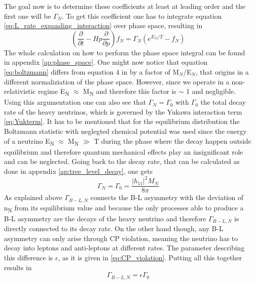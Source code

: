 The goal now is to determine these coefficients at least at leading order and the first one will be $\Gamma_N$. To get this coefficient one has to integrate equation \ref{eq:L_rate_expanding_interaction} over phase space, resulting in
\begin{equation}
	\left(\frac{\partial}{\partial t}-Hp\frac{\partial}{\partial p}\right)f_N=\Gamma_N\left(e^{E_N/T}-f_N\right)
	\label{eq:boltzmann}
\end{equation}
The whole calculation on how to perform the phase space integral can be found in appendix \ref{ap:phase_space}. \newline
One might now notice that equation \ref{eq:boltzmann} differs from equation 4 in \cite{Bodeker:2013qaa} by a factor of M$_N$/E$_N$, that origins in a different normaliziation of the phase space. However, since we operate in a non-relativistic regime E\textsubscript{N} $\approx$ M\textsubscript{N} and therefore this factor is $\sim$ 1 and negligible. Using this argumentation one can also see that $\Gamma_N=\Gamma_0$ with $\Gamma_0$ the total decay rate of the heavy neutrinos, which is governed by the Yukawa interaction term \ref{eq:Yukterm}. It has to be mentioned that for the equilibrium distribution the Boltzmann statistic with neglegted chemical potential was used since the energy of a neutrino E\textsubscript{N} $\approx$ M\textsubscript{N} $\gg$ T during the phase where the decay happen outside equilibrium and therefore quantum mechanical effects play an insignificant role and can be neglected. Going back to the decay rate, that can be calculated as done in appendix \ref{ap:tree_level_decay}, one gets
\begin{equation}
\Gamma_N=\Gamma_0=\frac{|h_{11}|^2M_N}{8\pi}
\label{eq:Gamma_N}
\end{equation}
As explained above $\Gamma_{B-L,N}$ connects the B-L asymmetry with the deviation of n\textsubscript{N} from its equilibrium value and because the only processes able to produce a B-L asymmetry  are the decays of the heavy neutrino and therefore $\Gamma_{B-L,N}$ is directly connected to its decay rate. On the other hand though, any B-L asymmetry can only arise through CP violation, meaning the neutrino has to decay into leptons and anti-leptons at different rates. The parameter describing this difference is $\epsilon$, as it is given in \ref{eq:CP_violation}. Putting all this together results in 
\begin{equation}
	\Gamma_{B-L,N}=\epsilon\Gamma_0
	\label{eq:Gamma_B-L,N}
\end{equation}
